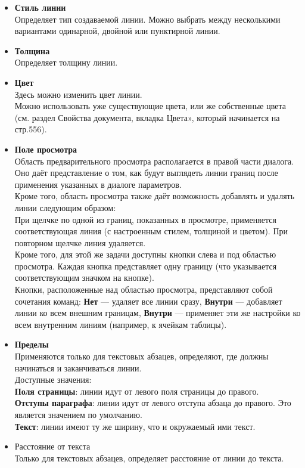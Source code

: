 \documentclass[a4paper,10pt]{article}
\begin{document}
\begin{itemize}
 \item \textbf{Стиль линии}\\
 Определяет тип создаваемой линии. Можно выбрать между несколькими вариантами одинарной, двойной или пунктирной линии.
 \item \textbf{Толщина}\\
 Определяет толщину линии.
 \item \textbf{Цвет}\\
 Здесь можно изменить цвет линии.\\
 Можно использовать уже существующие цвета, или же собственные цвета (см. раздел Свойства документа, вкладка Цвета», который начинается на стр.556).
 \item \textbf{Поле просмотра}\\
 Область предварительного просмотра располагается в правой части диалога. Оно даёт представление о том, как будут выглядеть линии границ после применения указанных в диалоге параметров.\\
 Кроме того, область просмотра также даёт возможность добавлять и удалять линии следующим образом:\\
 При щелчке по одной из границ, показанных в просмотре, применяется соответствующая линия (с настроенным стилем, толщиной и цветом). При повторном щелчке линия удаляется.\\
 Кроме того, для этой же задачи доступны кнопки слева и под областью просмотра. Каждая кнопка представляет одну границу (что указывается соответствующим значком на кнопке).\\
 Кнопки, расположенные над областью просмотра, представляют собой сочетания команд: \textbf{Нет} --- удаляет все линии сразу, \textbf{Внутри} --- добавляет линии ко всем внешним границам, \textbf{Внутри} --- применяет эти же настройки ко всем внутренним линиям (например, к ячейкам таблицы).
 \item \textbf{Пределы}\\
 Применяются только для текстовых абзацев, определяют, где должны начинаться и заканчиваться линии.\\
 Доступные значения:\\
 \textbf{Поля страницы}: линии идут от левого поля страницы до правого.\\
 \textbf{Отступы параграфа}: линии идут от левого отступа абзаца до правого. Это является значением по умолчанию.\\
 \textbf{Текст}: линии имеют ту же ширину, что и окружаемый ими текст.
 \item Расстояние от текста\\
 Только для текстовых абзацев, определяет расстояние от линии до текста.
\end{itemize}
\end{document}
